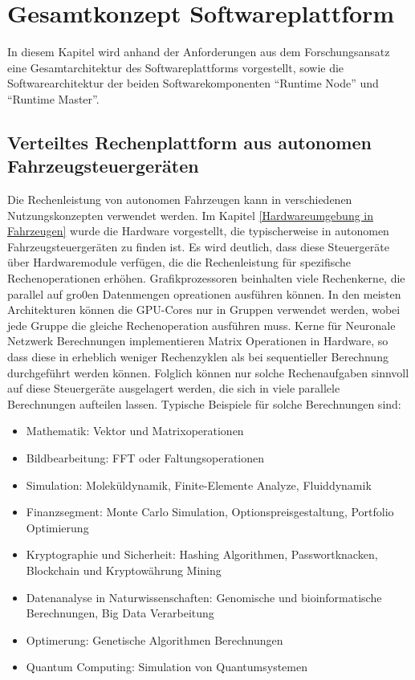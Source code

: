 \chapter{Gesamtkonzept Softwareplattform}

In diesem Kapitel wird anhand der Anforderungen aus dem Forschungsansatz eine Gesamtarchitektur des Softwareplattforms vorgestellt, sowie die Softwarearchitektur der beiden Softwarekomponenten \enquote{Runtime Node} und \enquote{Runtime Master}. 

\section{Verteiltes Rechenplattform aus autonomen Fahrzeugsteuergeräten}

Die Rechenleistung von autonomen Fahrzeugen kann in verschiedenen Nutzungskonzepten verwendet werden. Im Kapitel \autoref{Hardwareumgebung in Fahrzeugen} wurde die Hardware vorgestellt, die typischerweise in autonomen Fahrzeugsteuergeräten zu finden ist. Es wird deutlich, dass diese Steuergeräte über Hardwaremodule verfügen, die die Rechenleistung für spezifische Rechenoperationen erhöhen. Grafikprozessoren beinhalten viele Rechenkerne, die parallel auf gro0en Datenmengen opreationen ausführen können. In den meisten Architekturen können die GPU-Cores nur in Gruppen verwendet werden, wobei jede Gruppe die gleiche Rechenoperation ausführen muss. Kerne für Neuronale Netzwerk Berechnungen implementieren Matrix Operationen in Hardware, so dass diese in erheblich weniger Rechenzyklen als bei sequentieller Berechnung durchgeführt werden können. Folglich können nur solche Rechenaufgaben sinnvoll auf diese Steuergeräte ausgelagert werden, die sich in viele parallele Berechnungen aufteilen lassen. Typische Beispiele für solche Berechnungen sind:

\begin{itemize}
    \item Mathematik: Vektor und Matrixoperationen
    \item Bildbearbeitung: FFT oder Faltungsoperationen
    \item Simulation: Moleküldynamik, Finite-Elemente Analyze, Fluiddynamik
    \item Finanzsegment: Monte Carlo Simulation, Optionspreisgestaltung, Portfolio Optimierung
    \item Kryptographie und Sicherheit: Hashing Algorithmen, Passwortknacken, Blockchain und Kryptowährung Mining
    \item Datenanalyse in Naturwissenschaften: Genomische und bioinformatische Berechnungen, Big Data Verarbeitung
    \item Optimerung: Genetische Algorithmen Berechnungen
    \item Quantum Computing: Simulation von Quantumsystemen
\end{itemize}

